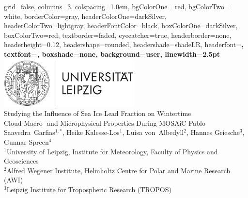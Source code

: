 \documentclass[portrate,a0paper,fontscale=0.45,margin=1cm]{baposter}
\begin{document}
\begin{poster}%
  {
  grid=false, %
  columns=3,
  colspacing=1.0em,
  bgColorOne= red, %
  bgColorTwo= white, %
  borderColor=gray, %
  headerColorOne=darkSilver, %
  headerColorTwo=lightgray, 
  headerFontColor=black, %
  boxColorOne=darkSilver, %
  boxColorTwo=red, %
  textborder=faded,
  eyecatcher=true,
  headerborder=none, %
  headerheight=0.12\textheight,
  headershape=rounded, %
  headershade=shadeLR,
  headerfont=\LARGE\bf,  %
  textfont={\color{black}\setlength{\parindent}{1.5em}},
  boxshade=none, %
  background=user, %
  linewidth=2.5pt
  }
  {
      \includegraphics[height=7.0em]{uni_leipzig-logo.jpg}\\
  }
  {
  	Studying the Influence of Sea Ice Lead Fraction on Wintertime\\Cloud Macro- and Microphysical Properties During MOSAiC
  }
  {\vspace{+1em} \color{black}Pablo Saavedra~Garfias$^{1,*}$, Heike Kalesse-Los$^{1}$, Luisa von~Albedyll$^{2}$, Hannes Griesche$^{3}$, Gunnar Spreen$^{4}$\\
    $^1$University of Leipzig, Institute for Meteorology, Faculty of Physics and Geosciences\\
    $^2$Alfred Wegener Institute, Helmholtz Centre for Polar and Marine Research (AWI)\\
    $^3$Leipzig Institute for Tropospheric Research (TROPOS)\\
}
\end{poster}
\end{document}

